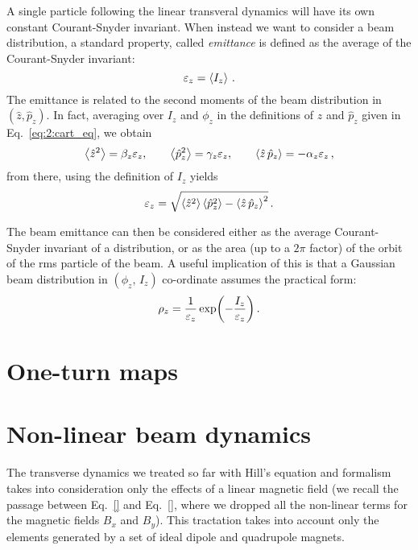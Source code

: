 A single particle following the linear transveral dynamics will have its own constant Courant-Snyder invariant. When instead we want to consider a beam distribution, a standard property, called \textit{emittance} is defined as the average of the Courant-Snyder invariant:
\begin{equation}
    \varepsilon_z = \left<{I_z}\right> \,.
\end{equation}
The emittance is related to the second moments of the beam distribution in $(\hat z,\hat p_z)$. In fact, averaging over $I_z$ and $\phi_z$ in the definitions of $\hat z$ and $\hat p_z$ given in Eq.~\eqref{eq:2:cart_eq}, we obtain
%
\begin{equation}
	\left<{\hat z^2}\right> = \beta_z \varepsilon_z, \qquad \left<{\hat p_z^2}\right>=\gamma_z \varepsilon_z, \qquad \left<{\hat z\,\hat p_z}\right>=-\alpha_z\varepsilon_z\,,
\end{equation}
%
from there, using the definition of $I_z$ yields
\begin{equation}
	\varepsilon_z = \sqrt{ \left<{\hat z^2}\right>\left<{\hat p_z^2}\right> - \left<{\hat z \, \hat p_z}\right>^2 }\,.
\end{equation}

The beam emittance can then be considered either as the average Courant-Snyder invariant of a distribution, or as the area (up to a $2\pi$ factor) of the orbit of the rms particle of the beam. A useful implication of this is that a Gaussian beam distribution in $(\phi_z,\,I_z)$ co-ordinate assumes the practical form:
%
\begin{equation}
\rho_z = \frac{1}{\varepsilon_z}\exp(-\frac{I_z}{\varepsilon_z})\,.
\end{equation}
%


\section{One-turn maps}

\section{Non-linear beam dynamics}\label{sec:non-linear}

The transverse dynamics we treated so far with Hill's equation and formalism takes into consideration only the effects of a linear magnetic field (we recall the passage between Eq.~\eqref{} and Eq.~\eqref{}, where we dropped all the non-linear terms for the magnetic fields $B_x$ and $B_y$). This tractation takes into account only the elements generated by a set of ideal dipole and quadrupole magnets.

